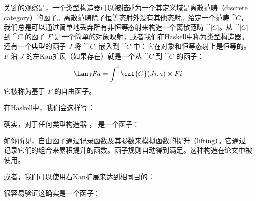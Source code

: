 关键的观察是，一个类型构造器可以被描述为一个其定义域是离散范畴（discrete category）的函子。离散范畴除了恒等态射外没有其他态射。给定一个范畴 $\cat{C}$，我们总是可以通过简单地丢弃所有非恒等态射来构造一个离散范畴 $\cat{|C|}$。从 $\cat{|C|}$ 到 $\cat{C}$ 的函子 $F$ 是一个简单的对象映射，或者我们在Haskell中称为类型构造器。还有一个典型的函子 $J$ 将 $\cat{|C|}$ 嵌入到 $\cat{C}$ 中：它在对象和恒等态射上是恒等的。$F$ 沿 $J$ 的左Kan扩展（如果存在）就是一个从 $\cat{C}$ 到 $\cat{C}$ 的函子：
\[\Lan_{J}F a = \int^i \cat{C}(J i, a)\times{}F i\]
它被称为基于 $F$ 的自由函子。

在Haskell中，我们会这样写：

确实，对于任何类型构造器 ， 是一个函子：

如你所见，自由函子通过记录函数及其参数来模拟函数的提升（lifting）。它通过记录它们的组合来累积提升的函数。函子规则自动得到满足。这种构造在论文中被使用。

或者，我们可以使用右Kan扩展来达到相同目的：

很容易验证这确实是一个函子：

